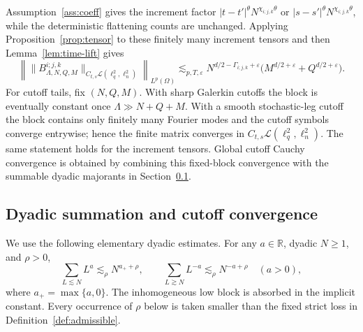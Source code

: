 \documentclass[11pt,reqno]{amsart}
\numberwithin{equation}{section}
\theoremstyle{plain}
\theoremstyle{definition}
\newcommand{\R}{\mathbb R}
\newcommand{\cL}{\mathcal L}
\newcommand{\eps}{\varepsilon}
\begin{document}
Assumption~\ref{ass:coeff} gives the increment factor \(|t-t'|^\theta N^{\chi_{i;j,k}\theta}\) or \(|s-s'|^\theta N^{\chi_{i;j,k}\theta}\), while the deterministic flattening counts are unchanged.  Applying Proposition~\ref{prop:tensor} to these finitely many increment tensors and then Lemma~\ref{lem:time-lift} gives
\begin{equation}\label{eq:time-lift}
        \left\|\|B_{\Lambda,N,Q,M}^{i;j,k}\|_{C_{t,s}\cL(\ell_q^2,\ell_n^2)}\right\|_{L^p(\Omega)}
        \lesssim_{p,T,\eps}
        N^{d/2-\Gamma_{i;j,k}+\eps}\bigl(M^{d/2+\eps}+Q^{d/2+\eps}\bigr).
\end{equation}
For cutoff tails, fix \((N,Q,M)\).  With sharp Galerkin cutoffs the block is eventually constant once \(\Lambda\gg N+Q+M\).  With a smooth stochastic-leg cutoff the block contains only finitely many Fourier modes and the cutoff symbols converge entrywise; hence the finite matrix converges in \(C_{t,s}\cL(\ell_q^2,\ell_n^2)\).  The same statement holds for the increment tensors.  Global cutoff Cauchy convergence is obtained by combining this fixed-block convergence with the summable dyadic majorants in Section~\ref{sec:assembly}.

\subsection{Dyadic summation and cutoff convergence}\label{sec:assembly}

We use the following elementary dyadic estimates.  For any \(a\in\R\), dyadic \(N\ge1\), and \(\rho>0\),
\begin{equation}\label{eq:dyadic-sum-basic}
        \sum_{L\lesssim N}L^a\lesssim_\rho N^{a_++\rho},
        \qquad
        \sum_{L\gtrsim N}L^{-a}\lesssim_\rho N^{-a+\rho}\quad(a>0),
\end{equation}
where \(a_+=\max\{a,0\}\).  The inhomogeneous low block is absorbed in the implicit constant.  Every occurrence of \(\rho\) below is taken smaller than the fixed strict loss in Definition~\ref{def:admissible}.
\end{document}
